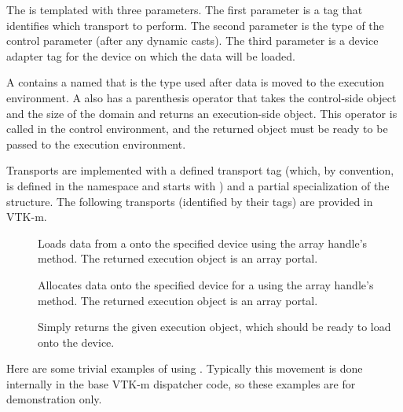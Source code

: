 The   is templated with three
parameters. The first parameter is a tag that identifies which transport to
perform. The second parameter is the type of the control parameter (after any
dynamic casts). The third parameter is a device adapter tag for the device
on which the data will be loaded.

A  contains a  named
 that is the type used after data is moved to the
execution environment. A  also has a
 parenthesis operator that takes the control-side object
and the size of the domain and returns an execution-side object. This
operator is called in the control environment, and the returned object must
be ready to be passed to the execution environment.

Transports are implemented with a defined transport tag (which, by
convention, is defined in the \vtkmcontarg{} namespace and starts with
) and a partial specialization of the
 structure. The following transports (identified by
their tags) are provided in VTK-m.

\begin{description}
\item[] 
  Loads data from a  onto the specified device using
  the array handle's  method. The returned
  execution object is an array portal.
\item[] 
  Allocates data onto the specified device for a 
  using the array handle's  method. The returned
  execution object is an array portal.
\item[]
   Simply returns the given execution
  object, which should be ready to load onto the device.
\end{description}

Here are some trivial examples of using
. Typically this movement is done internally in
the base VTK-m dispatcher code, so these examples are for demonstration
only.



